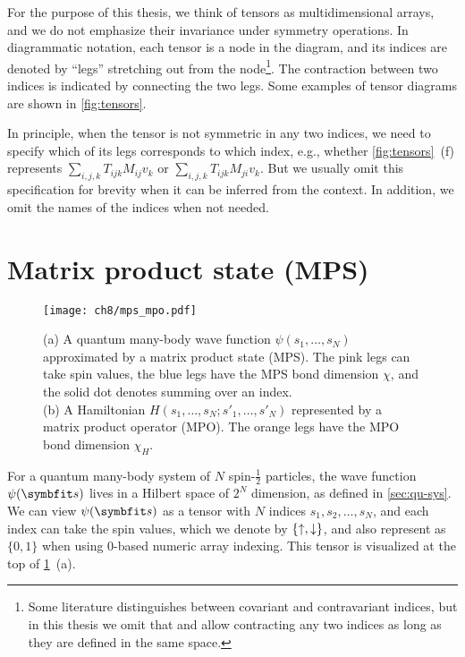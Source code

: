 For the purpose of this thesis, we think of tensors as multidimensional arrays, and we do not emphasize their invariance under symmetry operations. In diagrammatic notation, each tensor is a node in the diagram, and its indices are denoted by ``legs'' stretching out from the node\footnote{Some literature distinguishes between covariant and contravariant indices, but in this thesis we omit that and allow contracting any two indices as long as they are defined in the same space.}. The contraction between two indices is indicated by connecting the two legs. Some examples of tensor diagrams are shown in \cref{fig:tensors}.

In principle, when the tensor is not symmetric in any two indices, we need to specify which of its legs corresponds to which index, e.g., whether \cref{fig:tensors}~(f) represents $\sum_{i, j, k} T_{i j k} M_{i j} v_k$ or $\sum_{i, j, k} T_{i j k} M_{j i} v_k$. But we usually omit this specification for brevity when it can be inferred from the context. In addition, we omit the names of the indices when not needed.

\section{Matrix product state (MPS)}

\begin{figure}[htb]
\centering
\texttt{[image: ch8/mps\_mpo.pdf]}
\caption[Matrix product state (MPS) and matrix product operator (MPO)]{
(a) A quantum many-body wave function $\psi(s_1, \ldots, s_N)$ approximated by a matrix product state (MPS).
The {\color[HTML]{e377c2} pink} legs can take spin values, the {\color[HTML]{1f77b4} blue} legs have the MPS bond dimension $\chi$, and the solid dot denotes summing over an index. \\
(b) A Hamiltonian $H(s_1, \ldots, s_N; s'_1, \ldots, s'_N)$ represented by a matrix product operator (MPO).
The {\color[HTML]{ff7f0e} orange} legs have the MPO bond dimension $\chi_H$.
}
\label{fig:mps-mpo}
\end{figure}

For a quantum many-body system of $N$ spin-$\frac{1}{2}$ particles, the wave function $\psi(\vs)$ lives in a Hilbert space of $2^N$ dimension, as defined in \cref{sec:qu-sys}. We can view $\psi(\vs)$ as a tensor with $N$ indices $s_1, s_2, \ldots, s_N$, and each index can take the spin values, which we denote by $\{{\uparrow}, {\downarrow}\}$, and also represent as $\{0, 1\}$ when using $0$-based numeric array indexing. This tensor is visualized at the top of \cref{fig:mps-mpo}~(a).

